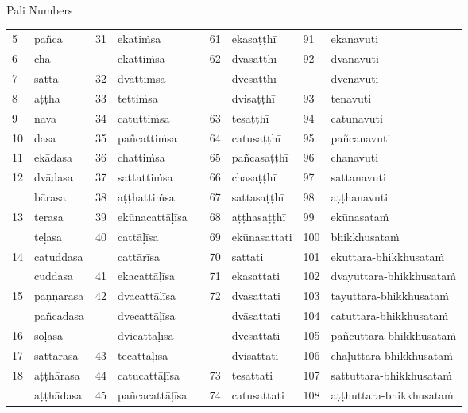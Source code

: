 {\normalsize Pali Numbers}\\[1cm]
\small
\begin{tabular}{p{}
				p{}
				|p{}
				p{}
				p{}
				p{}
				p{}
				|p{}
				p{}}
5 & pañca & 31 & ekatiṁsa &  & 61 & ekasaṭṭhī & 91 & ekanavuti\\
6 & cha &  & ekattiṁsa &  & 62 & dvāsaṭṭhī & 92 & dvanavuti\\
7 & satta & 32 & dvattiṁsa & & & dvesaṭṭhī & & dvenavuti\\
8 & aṭṭha & 33 & tettiṁsa &  &  & dvisaṭṭhī & 93 & tenavuti\\
9 & nava & 34 & catuttiṁsa &  & 63 & tesaṭṭhī & 94 & catunavuti\\
10 & dasa & 35 & pañcattiṁsa &  & 64 & catusaṭṭhī & 95 & pañcanavuti\\
11 & ekādasa & 36 & chattiṁsa &  & 65 & pañcasaṭṭhī & 96 & chanavuti\\
12 & dvādasa & 37 & sattattiṁsa &  & 66 & chasaṭṭhī & 97 & sattanavuti\\
 & bārasa & 38 & aṭṭhattiṁsa &  & 67 & sattasaṭṭhī & 98 & aṭṭhanavuti\\
13 & terasa & 39 & ekūnacattāḷīsa &  & 68 & aṭṭhasaṭṭhī & 99 & ekūnasataṁ\\
 & teḷasa & 40 & cattāḷīsa &  & 69 & ekūnasattati & 100 & bhikkhusataṁ\\
14 & catuddasa & & cattārīsa &  & 70 & sattati & 101 & ekuttara-bhikkhusataṁ\\
 & cuddasa & 41 & ekacattāḷīsa &  & 71 & ekasattati & 102 & dvayuttara-bhikkhusataṁ\\
15 & paṇṇarasa & 42 & dvacattāḷīsa &  & 72 & dvasattati & 103 & tayuttara-bhikkhusataṁ\\
 & pañcadasa & & dvecattāḷīsa &  & & dvāsattati & 104 & catuttara-bhikkhusataṁ\\
16 & soḷasa & & dvicattāḷīsa &  & & dvesattati & 105 & pañcuttara-bhikkhusataṁ\\
17 & sattarasa & 43 & tecattāḷīsa &  & & dvisattati & 106 & chaḷuttara-bhikkhusataṁ\\
18 & aṭṭhārasa & 44 & catucattāḷīsa &  & 73 & tesattati & 107 & sattuttara-bhikkhusataṁ\\
 & aṭṭhādasa & 45 & pañcacattāḷīsa &  & 74 & catusattati & 108 & aṭṭhuttara-bhikkhusataṁ\\

\end{tabular}
